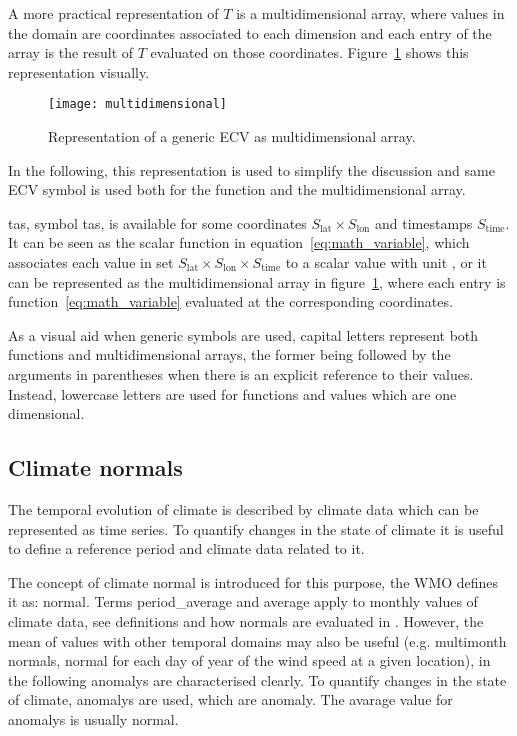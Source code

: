 A more practical representation of $T$ is a multidimensional array, where values in the domain are coordinates associated to each dimension and each entry of the array is the result of $T$ evaluated on those coordinates. Figure~\ref{fig:multidimensional} shows this representation visually.
\begin{figure}[h]
  \centering
  \texttt{[image: multidimensional]}
  \caption{Representation of a generic \gls{ECV} as multidimensional array.}
  \label{fig:multidimensional}
\end{figure}
In the following, this representation is used to simplify the discussion and same \gls{ECV} symbol is used both for the function and the multidimensional array.
\begin{example}
  \Glsdesc{tas}, symbol \gls{tas}, is available for some coordinates $S_\text{lat} \times S_\text{lon}$ and timestamps $S_\text{time}$. It can be seen as the scalar function in equation~\eqref{eq:math_variable}, which associates each value in set $S_\text{lat} \times S_\text{lon} \times S_\text{time}$ to a scalar value with unit , or it can be represented as the multidimensional array in figure~\ref{fig:multidimensional}, where each entry is function~\eqref{eq:math_variable} evaluated at the corresponding coordinates.
\end{example}

As a visual aid when generic symbols are used, capital letters represent both functions and multidimensional arrays, the former being followed by the arguments in parentheses when there is an explicit reference to their values. Instead, lowercase letters are used for functions and values which are one dimensional.



\subsection{Climate normals}
The temporal evolution of climate is described by climate data which can be represented as time series. To quantify changes in the state of climate it is useful to define a reference period and climate data related to it.

The concept of climate \gls{normal} is introduced for this purpose, the \gls{WMO} defines it as: \glsdesc{normal}. Terms \Gls{period_average} and \gls{average} apply to monthly values of climate data, see definitions and how \glspl{normal} are evaluated in \cite[5-6]{2017WorldMeteorologicalOrganizationWMOWMOGuidelines}. However, the mean of values with other temporal domains may also be useful (e.g. multimonth \glspl{normal}, normal for each day of year of the wind speed at a given location), in the following \glspl{anomaly} are characterised clearly.
To quantify changes in the state of climate, \glspl{anomaly} are used, which are \glsdesc{anomaly}. The avarage value for \glspl{anomaly} is usually \gls{normal}.

